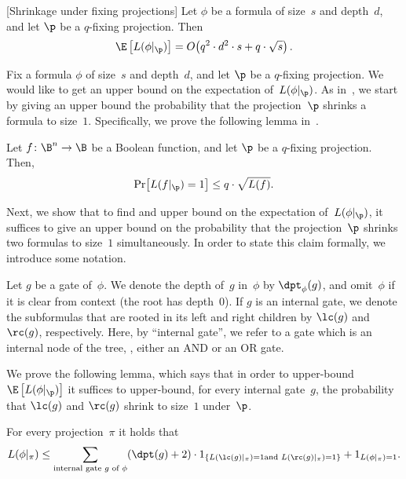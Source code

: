 \documentclass{toc}
\begin{document}
\begin{restated}{}[Shrinkage under fixing projections]
Let $\phi$ be a formula of size~$s$ and depth~$d$, and let
$\p$ be a $q$-fixing projection. Then 
\[
\E\left[L(\phi|_{\p})\right]=O\!\left(q^{2}\cdot d^{2}\cdot s+q\cdot\sqrt{s}\right).
\]
\end{restated}

Fix a formula $\phi$ of size~$s$ and depth~$d$, and let $\p$
be a $q$-fixing projection. We would like to
%
get an upper bound on  %
the expectation
of~$L(\phi|_{\p})$. As in~\cite{H98}, we start by 
%
giving an upper bound %
the probability that the projection~$\p$ shrinks a formula to size~$1$.
Specifically, we prove the following lemma in~. 
\begin{lemma}
\label{lemma:shrinkage-to-single-literal}Let $f\colon\B^{n}\to\B$ be a
Boolean function, and let $\p$ be a $q$-fixing projection. Then,
\[
\Pr\!\left[L(f|_{\p})=1\right]\le q\cdot\sqrt{L(f)}.
\]
\end{lemma}

Next, we show that to %
find and upper bound on %
the expectation of~$L(\phi|_{\p})$,
it suffices to %
give an upper bound on %
the probability that the projection~$\p$
shrinks two formulas to size~$1$ simultaneously. In order to state
this claim formally, we introduce some notation. 
\begin{notation}
Let $g$ be a gate of~$\phi$. We denote the depth of~$g$ in~$\phi$
by $\dpt_{\phi}(g)$, and omit~$\phi$ if it is clear from context
(the root has depth~$0$). If $g$ is an internal gate, we denote
the %
subformulas  %
that are rooted in its left and right children by
$\lc(g)$ and $\rc(g)$, respectively. Here, by ``internal gate'',
we refer to a gate which is an internal node of the tree, \ie, either
an AND or an OR gate.
\end{notation}

We prove the following lemma, which says that in order to upper-bound
$\E\left[L(\phi|_{\p})\right]$ it suffices to upper-bound, for every
internal gate~$g$, the probability that $\lc(g)$ and $\rc(g)$
shrink to size~$1$ under~$\p$. 
\begin{lemma}
\label{lemma:reduction-to-size-2}For every projection~$\pi$ it holds
that   %
\[
L(\phi|_{\pi})\le\sum_{\text{\rm internal gate \ensuremath{g} of \ensuremath{\phi}}}(\dpt(g)+2)\cdot1_{\left\{ L(\lc(g)|_{\pi})=1\text{\rm  and }L(\rc(g)|_{\pi})=1\right\} }+1_{L(\phi|_{\pi})=1}.
\]
\end{lemma}
\end{document}
